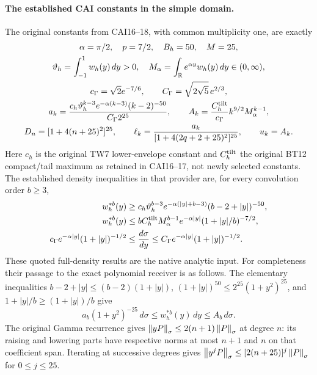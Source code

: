 \documentclass[11pt]{article}
\begin{document}
\paragraph{The established CAI constants in the simple domain.}
The original constants from CAI16--18, with common multiplicity one,
are exactly
\begin{equation}\label{lgamma:eq:CAIconstants}
 \begin{gathered}
 \alpha=\pi/2,\quad p=7/2,\quad B_h=50,\quad M=25,\\
 \vartheta_h=\int_{-1}^1w_h(y)\,dy>0,\quad
 M_\alpha=\int_\mathbb R e^{\alpha y}w_h(y)\,dy\in(0,\infty),\\
 c_\Gamma=\sqrt2e^{-7/6},\qquad C_\Gamma=\sqrt{2\sqrt5}\,e^{2/3},\\
 a_k=\frac{c_h\vartheta_h^{k-3}e^{-\alpha(k-3)}(k-2)^{-50}}
              {C_\Gamma2^{25}},\qquad
 A_k=\frac{C_h^{\rm tilt}}{c_\Gamma}k^{9/2}M_\alpha^{k-1},\\
 D_n=[1+4(n+25)^2]^{25},\qquad
 \ell_k=\frac{a_k}{[1+4(2q+2+25)^2]^{25}},\qquad u_k=A_k.
 \end{gathered}
\end{equation}
Here $c_h$ is the original TW7 lower-envelope constant and
$C_h^{\rm tilt}$ the original BT12 compact/tail maximum as retained in
CAI16--17, not newly selected constants.  The established density
inequalities in that provider are, for every convolution order $b\ge3$,
\begin{align}
 w_h^{*b}(y)&\ge c_h\vartheta_h^{b-3}
 e^{-\alpha(|y|+b-3)}(b-2+|y|)^{-50},\label{lgamma:eq:CAIlowdens}\\
 w_h^{*b}(y)&\le bC_h^{\rm tilt}M_\alpha^{b-1}
 e^{-\alpha|y|}(1+|y|/b)^{-7/2},\label{lgamma:eq:CAIupdens}\\
 c_\Gamma e^{-\alpha|y|}(1+|y|)^{-1/2}
 &\le\frac{d\sigma}{dy}
 \le C_\Gamma e^{-\alpha|y|}(1+|y|)^{-1/2}.
 \label{lgamma:eq:CAIgammadens}
\end{align}
These quoted full-density results are the native analytic input.  For
completeness their passage to the exact polynomial receiver is as follows.
The elementary inequalities
$b-2+|y|\le(b-2)(1+|y|)$,
$(1+|y|)^{50}\le2^{25}(1+y^2)^{25}$, and
$1+|y|/b\ge(1+|y|)/b$ give
\[
 a_b(1+y^2)^{-25}\,d\sigma\le w_h^{*b}(y)\,dy\le A_b\,d\sigma.
\]
The original Gamma recurrence gives
$\left\lVert yP\right\rVert_\sigma\le2(n+1)\left\lVert P\right\rVert_\sigma$ at degree $n$:
its raising and lowering parts have respective norms at most $n+1$
and $n$ on that coefficient span.  Iterating at successive degrees gives
$\left\lVert y^jP\right\rVert_\sigma\le[2(n+25)]^j\left\lVert P\right\rVert_\sigma$ for $0\le j\le25$.
\end{document}
